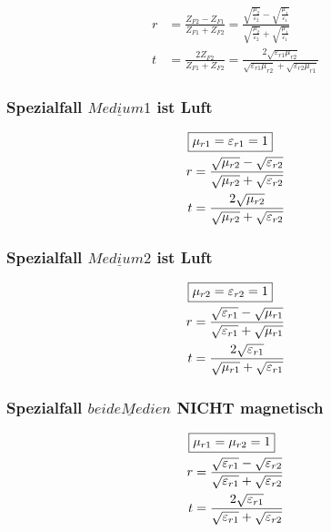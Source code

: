 \begin{align*}
    r & = \frac{Z_{F2} - Z_{F1}}{Z_{F1} + Z_{F2}} = \frac{\sqrt{\frac{\mu_2}{\varepsilon_2}} - \sqrt{\frac{\mu_1}{\varepsilon_1}}}{\sqrt{\frac{\mu_2}{\varepsilon_2}} + \sqrt{\frac{\mu_1}{\varepsilon_1}}} \\
    t & = \frac{2 Z_{F2}}{Z_{F1} + Z_{F2}} = \frac{2\sqrt{\varepsilon_{r1}\mu_{r2}}}{\sqrt{\varepsilon_{r1}\mu_{r2}}+\sqrt{\varepsilon_{r2}\mu_{r1}}}
\end{align*}


\subsubsection{Spezialfall $\underline{Medium 1}$ ist Luft}
\begin{align*}
    \Aboxed{&\mu_{r1} = \varepsilon_{r1} = 1}\\
    r &= \frac{\sqrt{\mu_{r2}}-\sqrt{\varepsilon_{r2}}}{{\sqrt{\mu_{r2}}+\sqrt{\varepsilon_{r2}}}}\\
    t &= \frac{2\sqrt{\mu_{r2}}}{\sqrt{\mu_{r2}}+\sqrt{\varepsilon_{r2}}}
\end{align*}

\subsubsection{Spezialfall $\underline{Medium 2}$ ist Luft}
\begin{align*}
    \Aboxed{&\mu_{r2} = \varepsilon_{r2} = 1}\\
    r &= \frac{\sqrt{\varepsilon_{r1}}-\sqrt{\mu_{r1}}}{{\sqrt{\varepsilon_{r1}}+\sqrt{\mu_{r1}}}}\\
    t &= \frac{2\sqrt{\varepsilon_{r1}}}{\sqrt{\mu_{r1}}+\sqrt{\varepsilon_{r1}}}
\end{align*}

\subsubsection{Spezialfall $\underline{beide Medien}$ NICHT magnetisch}
\begin{align*}
    \Aboxed{&\mu_{r1} = \mu_{r2} = 1}\\
    r &= \frac{\sqrt{\varepsilon_{r1}}-\sqrt{\varepsilon_{r2}}}{{\sqrt{\varepsilon_{r1}}+\sqrt{\varepsilon_{r2}}}}\\
    t &= \frac{2\sqrt{\varepsilon_{r1}}}{\sqrt{\varepsilon_{r1}}+\sqrt{\varepsilon_{r2}}}
\end{align*}

